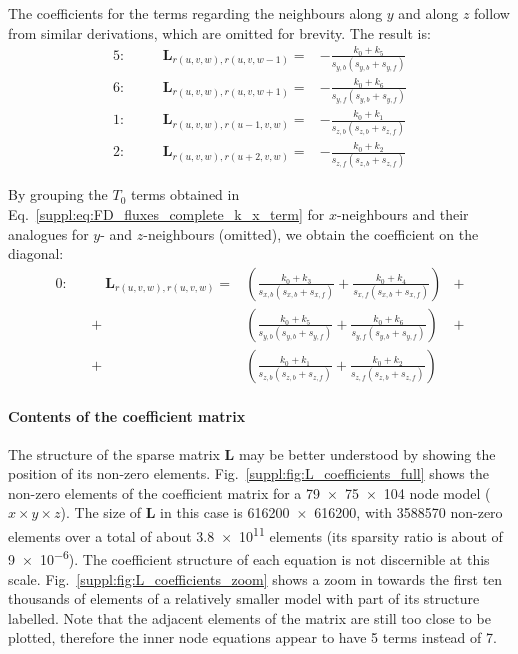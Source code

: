 The coefficients for the terms regarding the neighbours along $y$ and along $z$ follow from similar derivations, which are omitted for brevity.
The result is:
\begin{align}
    \label{suppl:eq:L_coefficients_y_z_terms}
    5: &&\quad \bm{L}_{r(u,v,w),r(u,v,w-1)} = & - \frac{k_0 + k_5}{s_{y,b} (s_{y,b} + s_{y,f})} \\[2ex]
    6: &&\quad \bm{L}_{r(u,v,w),r(u,v,w+1)} = & - \frac{k_0 + k_6}{s_{y,f} (s_{y,b} + s_{y,f})} \\[2ex]
    1: &&\quad \bm{L}_{r(u,v,w),r(u-1,v,w)} = & - \frac{k_0 + k_1}{s_{z,b} (s_{z,b} + s_{z,f})} \\[2ex]
    2: &&\quad \bm{L}_{r(u,v,w),r(u+2,v,w)} = & - \frac{k_0 + k_2}{s_{z,f} (s_{z,b} + s_{z,f})}
\end{align}

By grouping the $T_0$ terms obtained in Eq.~\ref{suppl:eq:FD_fluxes_complete_k_x_term} for $x$-neighbours and their analogues for $y$- and $z$-neighbours (omitted), we obtain the coefficient on the diagonal:
\begin{align}
    \label{suppl:eq:L_coefficients_diagonal_full}
    0: &&\quad \bm{L}_{r(u,v,w),r(u,v,w)} = &
    \left(
        \frac{k_0 + k_3}{s_{x,b} (s_{x,b} + s_{x,f})} +
        \frac{k_0 + k_4}{s_{x,f} (s_{x,b} + s_{x,f})} \right) & + \nonumber \\[2ex]
    && + & \left(
        \frac{k_0 + k_5}{s_{y,b} (s_{y,b} + s_{y,f})} +
        \frac{k_0 + k_6}{s_{y,f} (s_{y,b} + s_{y,f})} \right) & + \nonumber \\[2ex]
    && + & \left(
        \frac{k_0 + k_1}{s_{z,b} (s_{z,b} + s_{z,f})} +
        \frac{k_0 + k_2}{s_{z,f} (s_{z,b} + s_{z,f})} \right)
\end{align}

\FloatBarrier

\paragraph*{Contents of the coefficient matrix}
The structure of the sparse matrix $\bm{L}$ may be better understood by showing the position of its non-zero elements.
Fig.~\ref{suppl:fig:L_coefficients_full} shows the non-zero elements of the coefficient matrix for a \num{79}~$\times$~\num{75}~$\times$~\num{104} node model ($x \times y \times z$).
The size of $\bm{L}$ in this case is \num{616200}~$\times$~\num{616200}, with \num{3588570} non-zero elements over a total of about \num{3.8e11} elements (its sparsity ratio is about of \num{9e-6}).
The coefficient structure of each equation is not discernible at this scale.
Fig.~\ref{suppl:fig:L_coefficients_zoom} shows a zoom in towards the first ten thousands of elements of a relatively smaller model with part of its structure labelled.
Note that the adjacent elements of the matrix are still too close to be plotted, therefore the inner node equations appear to have \num{5} terms instead of \num{7}.

